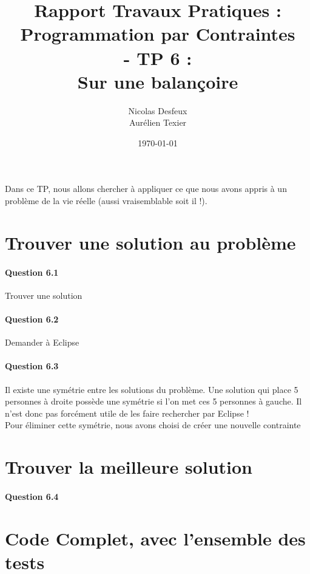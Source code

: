 \documentclass[11pt]{article} %
\date{\today}
\title{Rapport Travaux Pratiques : \\Programmation par Contraintes\\ - TP 6 : \\\textbf{Sur une balançoire}}
\author{Nicolas Desfeux\\Aurélien Texier}
\begin{document}
\lstset{language=Prolog,breaklines=true,numbers=left,basicstyle=\footnotesize ,numberstyle=\footnotesize}
\maketitle
\paragraph{} Dans ce TP, nous allons chercher à appliquer ce que nous avons appris à un problème de la vie réelle (aussi vraisemblable soit il !).

\section{Trouver une solution au problème}
\paragraph{Question 6.1} Trouver une solution
\paragraph{Question 6.2} Demander à Eclipse
\paragraph{Question 6.3} Il existe une symétrie entre les solutions du problème. Une solution qui place 5 personnes à droite possède une symétrie si l'on met ces 5 personnes à gauche. Il n'est donc pas forcément utile de les faire rechercher par Eclipse !\\
Pour éliminer cette symétrie, nous avons choisi de créer une nouvelle contrainte


\section{Trouver la meilleure solution}
\paragraph{Question 6.4}
\newpage

\section{Code Complet, avec l'ensemble des tests}

\end{document}
